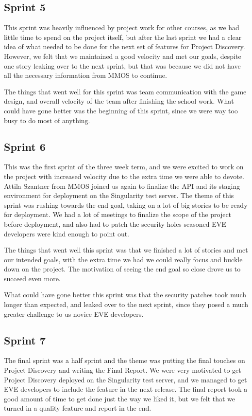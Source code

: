 \subsection{Sprint 5}
This sprint was heavily influenced by project work for other courses, as we had little time to spend on the project itself, but after the last sprint we had a clear idea of what needed to be done for the next set of features for Project Discovery. However, we felt that we maintained a good velocity and met our goals, despite one story leaking over to the next sprint, but that was because we did not have all the necessary information from MMOS to continue.

The things that went well for this sprint was team communication with the game design, and overall velocity of the team after finishing the school work. What could have gone better was the beginning of this sprint, since we were way too busy to do most of anything.

\subsection{Sprint 6}
This was the first sprint of the three week term, and we were excited to work on the project with increased velocity due to the extra time we were able to devote. Attila Szantner from MMOS joined us again to finalize the API and its staging environment for deployment on the Singularity test server. The theme of this sprint was rushing towards the end goal, taking on a lot of big stories to be ready for deployment. We had a lot of meetings to finalize the scope of the project before deployment, and also had to patch the security holes seasoned EVE developers were kind enough to point out. 

The things that went well this sprint was that we finished a lot of stories and met our intended goals, with the extra time we had we could really focus and buckle down on the project. The motivation of seeing the end goal so close drove us to succeed even more.

What could have gone better this sprint was that the security patches took much longer than expected, and leaked over to the next sprint, since they posed a much greater challenge to us novice EVE developers.

\subsection{Sprint 7}
The final sprint was a half sprint and the theme was putting the final touches on Project Discovery and writing the Final Report. We were very motivated to get Project Discovery deployed on the Singularity test server, and we managed to get EVE developers to include the feature in the next release. The final report took a good amount of time to get done just the way we liked it, but we felt that we turned in a quality feature and report in the end.
 